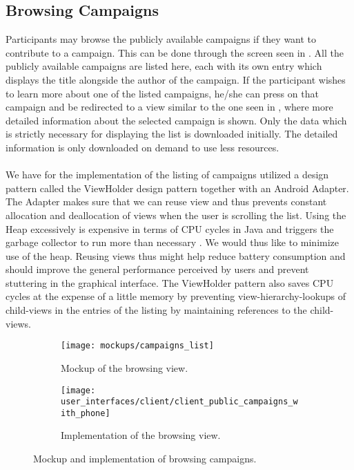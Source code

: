\subsection{Browsing Campaigns}
\label{sub:browsing_campaigns}



Participants may browse the publicly available campaigns if they want to contribute to a campaign. This can be done through the screen seen in . All the publicly available campaigns are listed here, each with its own entry which displays the title alongside the author of the campaign. If the participant wishes to learn more about one of the listed campaigns, he/she can press on that campaign and be redirected to a view similar to the one seen in , where more detailed information about the selected campaign is shown. Only the data which is strictly necessary for displaying the list is downloaded initially. The detailed information is only downloaded on demand to use less resources.
\\\\
We have for the implementation of the listing of campaigns utilized a design pattern called the ViewHolder design pattern \parencite{view_holder_pattern} together with an Android Adapter. The Adapter makes sure that we can reuse view and thus prevents constant allocation and deallocation of views when the user is scrolling the list. Using the Heap excessively is expensive in terms of CPU cycles in Java and triggers the garbage collector to run more than necessary \parencite{android_garbage_collection}. We would thus like to minimize use of the heap. Reusing views thus might help reduce battery consumption and should improve the general performance perceived by users and prevent stuttering in the graphical interface. The ViewHolder pattern also saves CPU cycles at the expense of a little memory by preventing view-hierarchy-lookups of child-views in the entries of the listing by maintaining references to the child-views.

\begin{figure}[!htbp]
    \begin{subfigure}[!t]{.48\textwidth}
        \centering
        \texttt{[image: mockups/campaigns\_list]}
        \caption{Mockup of the browsing view.}
        \label{fig:mockup_public_campaigns}
    \end{subfigure}%
    \begin{subfigure}[!t]{.52\textwidth}
        \centering
        \texttt{[image: user\_interfaces/client/client\_public\_campaigns\_with\_phone]}
        \caption{Implementation of the browsing view.}
        \label{fig:implementation_public_campaigns}
    \end{subfigure}
    \caption{Mockup and implementation of browsing campaigns.}
    \label{fig:public_campaigns}
\end{figure}
\FloatBarrier


